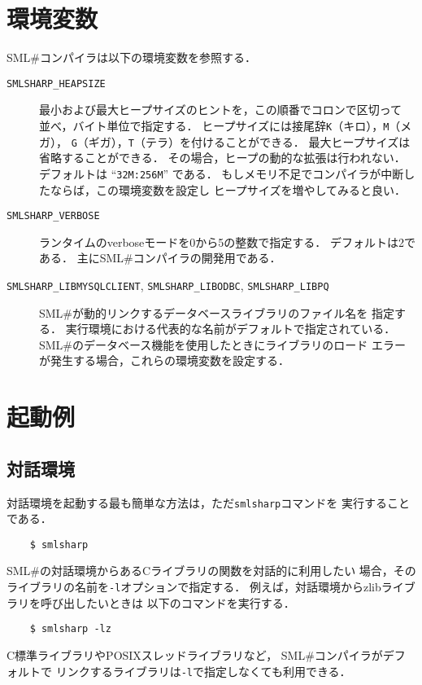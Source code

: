\documentclass{jbook}
\newcommand{\smlsharp}{SML\#}
\begin{document}
\section{環境変数}

	\smlsharp{}コンパイラは以下の環境変数を参照する．

\begin{description}
\item[{\tt SMLSHARP\_HEAPSIZE}]
	最小および最大ヒープサイズのヒントを，この順番でコロンで区切って
並べ，バイト単位で指定する．
	ヒープサイズには接尾辞{\tt K}（キロ），{\tt M}（メガ），
{\tt G}（ギガ），{\tt T}（テラ）を付けることができる．
	最大ヒープサイズは省略することができる．
	その場合，ヒープの動的な拡張は行われない．
	デフォルトは ``{\tt 32M:256M}'' である．
	もしメモリ不足でコンパイラが中断したならば，この環境変数を設定し
ヒープサイズを増やしてみると良い．

\item[{\tt SMLSHARP\_VERBOSE}]
	ランタイムのverboseモードを0から5の整数で指定する．
	デフォルトは2である．
	主に\smlsharp{}コンパイラの開発用である．

\item[{\tt SMLSHARP\_LIBMYSQLCLIENT},
      {\tt SMLSHARP\_LIBODBC},
      {\tt SMLSHARP\_LIBPQ}]
	\smlsharp{}が動的リンクするデータベースライブラリのファイル名を
指定する．
	実行環境における代表的な名前がデフォルトで指定されている．
	\smlsharp{}のデータベース機能を使用したときにライブラリのロード
エラーが発生する場合，これらの環境変数を設定する．
\end{description}

\section{起動例}

\subsection{対話環境}

	対話環境を起動する最も簡単な方法は，ただ{\tt smlsharp}コマンドを
実行することである．
\begin{verbatim}
    $ smlsharp
\end{verbatim}
	\smlsharp{}の対話環境からあるCライブラリの関数を対話的に利用したい
場合，そのライブラリの名前を{\tt -l}オプションで指定する．
	例えば，対話環境からzlibライブラリを呼び出したいときは
以下のコマンドを実行する．
\begin{verbatim}
    $ smlsharp -lz
\end{verbatim}
	C標準ライブラリやPOSIXスレッドライブラリなど，
\smlsharp{}コンパイラがデフォルトで
リンクするライブラリは{\tt -l}で指定しなくても利用できる．
\end{document}
